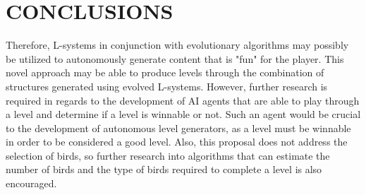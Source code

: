 \documentclass[letterpaper, 10 pt, conference]{ieeeconf}
\begin{document}
\section{CONCLUSIONS}
Therefore, L-systems in conjunction with evolutionary algorithms may possibly be utilized to autonomously generate content that is "fun" for the player. This novel approach may be able to produce levels through the combination of structures generated using evolved L-systems. However, further research is required in regards to the development of AI agents that are able to play through a level and determine if a level is winnable or not. Such an agent would be crucial to the development of autonomous level generators, as a level must be winnable in order to be considered a good level. Also, this proposal does not address the selection of birds, so further research into algorithms that can estimate the number of birds and the type of birds required to complete a level is also encouraged. 

\addtolength{\textheight}{-12cm}  



\end{document}
